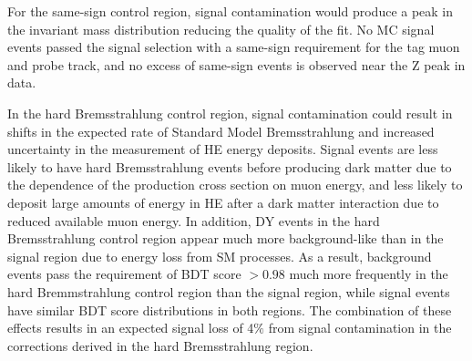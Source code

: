 For the same-sign control region, signal contamination would produce a peak in the invariant mass distribution reducing the quality of the fit. No MC signal events passed the signal selection with a same-sign requirement for the tag muon and probe track, and no excess of same-sign events is observed near the Z peak in data.

In the hard Bremsstrahlung control region, signal contamination could result in shifts in the expected rate of Standard Model Bremsstrahlung and increased uncertainty in the measurement of HE energy deposits. Signal events are less likely to have hard Bremsstrahlung events before producing dark matter due to the dependence of the production cross section on muon energy, and less likely to deposit large amounts of energy in HE after a dark matter interaction due to reduced available muon energy. In addition, DY events in the hard Bremsstrahlung control region appear much more background-like than in the signal region due to energy loss from SM processes. As a result, background events pass the requirement of BDT score $>0.98$ much more frequently in the hard Bremmstrahlung control region than the signal region, while signal events have similar BDT score distributions in both regions. The combination of these effects results in an expected signal loss of 4$\%$ from signal contamination in the corrections derived in the hard Bremsstrahlung region.
